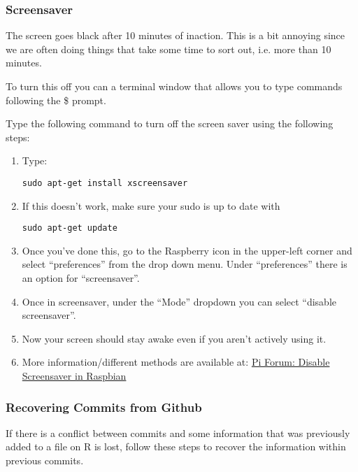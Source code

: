 \documentclass{article}\usepackage[]{graphicx}\usepackage[]{color}
\begin{document}
\subsubsection{Screensaver}

The screen goes black after 10 minutes of inaction. This is a bit annoying since we are often doing things that take some time to sort out, i.e. more than 10 minutes. 

To turn this off you can a terminal window that allows you to type commands following the \$ prompt. 

Type the following command to turn off the screen saver using the following steps: 

\begin{enumerate}

\item Type: 

\begin{lstlisting}
sudo apt-get install xscreensaver
\end{lstlisting}

\item If this doesn't work, make sure your sudo is up to date with 
\begin{lstlisting}
sudo apt-get update
\end{lstlisting}

\item Once you've done this, go to the Raspberry icon in the upper-left corner and select ``preferences'' from the drop down menu.  Under ``preferences'' there is an option for ``screensaver''.

\item Once in screensaver, under the ``Mode'' dropdown you can select ``disable screensaver''.

\item Now your screen should stay awake even if you aren't actively using it.

\item More information/different methods are available at: \href{https://www.raspberrypi.org/forums/viewtopic.php?f=91&t=57552}{Pi Forum:  Disable Screensaver in Raspbian}

\end{enumerate}

\subsubsection{Recovering Commits from Github}

If there is a conflict between commits and some information that was previously added to a file on R is lost, follow these steps to recover the information within previous commits.
\end{document}
